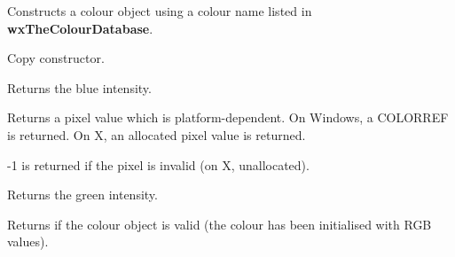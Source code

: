 Constructs a colour object using a colour name
listed in {\bf wxTheColourDatabase}.


Copy constructor.












\label{wxcolourblue}


Returns the blue intensity.


\label{wxcolourgetpixel}


Returns a pixel value which is platform-dependent. On Windows, a COLORREF is returned.
On X, an allocated pixel value is returned.

-1 is returned if the pixel is invalid (on X, unallocated).


\label{wxcolourgreen}


Returns the green intensity.


\label{wxcolourok}


Returns \true if the colour object is valid (the colour has been initialised with RGB values).


\label{wxcolourred}

